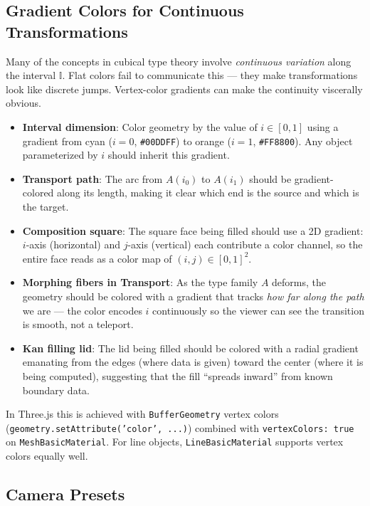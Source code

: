 \documentclass[11pt, a4paper]{article}
\begin{document}
\subsection{Gradient Colors for Continuous Transformations}

Many of the concepts in cubical type theory involve \emph{continuous variation} along
the interval $\mathbb{I}$. Flat colors fail to communicate this — they make
transformations look like discrete jumps. Vertex-color gradients can make the
continuity viscerally obvious.

\begin{itemize}
  \item \textbf{Interval dimension}: Color geometry by the value of $i \in [0,1]$
    using a gradient from cyan ($i=0$, \texttt{\#00DDFF}) to orange ($i=1$,
    \texttt{\#FF8800}). Any object parameterized by $i$ should inherit this gradient.
  \item \textbf{Transport path}: The arc from $A(i_0)$ to $A(i_1)$ should be
    gradient-colored along its length, making it clear which end is the source and
    which is the target.
  \item \textbf{Composition square}: The square face being filled should use a 2D
    gradient: $i$-axis (horizontal) and $j$-axis (vertical) each contribute a
    color channel, so the entire face reads as a color map of $(i, j) \in [0,1]^2$.
  \item \textbf{Morphing fibers in Transport}: As the type family $A$ deforms, the
    geometry should be colored with a gradient that tracks \emph{how far along the
    path} we are — the color encodes $i$ continuously so the viewer can see the
    transition is smooth, not a teleport.
  \item \textbf{Kan filling lid}: The lid being filled should be colored with a
    radial gradient emanating from the edges (where data is given) toward the
    center (where it is being computed), suggesting that the fill ``spreads inward''
    from known boundary data.
\end{itemize}

In Three.js this is achieved with \texttt{BufferGeometry} vertex colors
(\texttt{geometry.setAttribute('color', ...)}) combined with
\texttt{vertexColors: true} on \texttt{MeshBasicMaterial}. For line objects,
\texttt{LineBasicMaterial} supports vertex colors equally well.

\subsection{Camera Presets}
\end{document}

